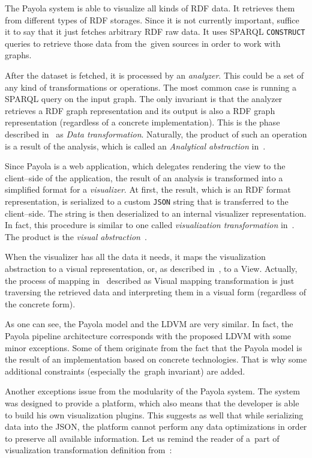 The Payola system is able to visualize all kinds of RDF data. It retrieves them from different
types of RDF storages. Since it is not currently important, suffice it to say that it just fetches
arbitrary RDF raw data. It uses SPARQL \texttt{CONSTRUCT} queries to retrieve those data from
the~given sources in order to work with graphs.

After the dataset is fetched, it is processed by an \emph{analyzer}. This could be a set of any kind
of transformations or operations. The most common case is running a SPARQL query
on the input graph. The only invariant is that the analyzer retrieves a RDF graph
representation and its output is also a RDF graph representation (regardless of a concrete
implementation). This is the phase described in~\cite{ldvm} as \emph{Data transformation}.
Naturally, the product of such an operation is a result of the analysis, which is called an
\emph{Analytical abstraction} in~\cite{ldvm}.

Since Payola is a web application, which delegates rendering the view to the client--side
of the application, the result of an analysis is transformed into a simplified format for a \emph{visualizer}.
At first, the result, which is an RDF format representation, is serialized to a custom \texttt{JSON} string
that is transferred to the client--side. The string is then deserialized to an internal visualizer
representation. In fact, this procedure is similar to one called \emph{visualization transformation}
in~\cite{ldvm}. The product is the \emph{visual abstraction}~\cite{ldvm}.

When the visualizer has all the data it needs, it maps the visualization abstraction to a visual
representation, or, as described in~\cite{ldvm}, to a View. Actually, the process of mapping in~\cite{ldvm}
described as Visual mapping transformation is just traversing the retrieved data and interpreting
them in a visual form (regardless of the concrete form).

As one can see, the Payola model and the LDVM are very similar. In fact, the Payola pipeline
architecture corresponds with the proposed LDVM with some minor exceptions. Some of them
originate from the fact that the Payola model is the result of an implementation
based on concrete technologies. That is why some additional constraints (especially
the~graph invariant) are added.

Another exceptions issue from the modularity of the Payola system. The system was designed
to provide a platform, which also means that the developer is able to build his own visualization 
plugins. This suggests as well that while serializing data into the JSON, the platform cannot perform
any data optimizations in order to preserve all available information. Let us remind the reader of
a~part of visualization transformation definition from~\cite{ldvm}:

